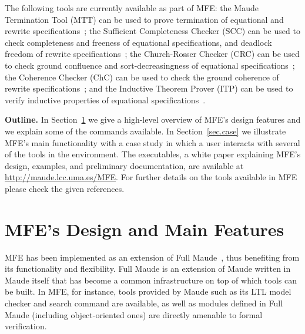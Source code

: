 \documentclass{llncs}
\begin{document}
The following tools are currently available as part of MFE: the Maude Termination
Tool (MTT) can be used to prove termination of equational and rewrite specifications~\cite{Duran-Lucas-Meseguer:2008-ijcar}; %
the Sufficient Completeness Checker (SCC)
can be used to check completeness and freeness of equational specifications, and deadlock freedom of rewrite specifications~\cite{Hendrix:2008,Rocha-Meseguer:2010}; %
the Church-Rosser Checker (CRC) can be used to check
ground confluence and sort-decreasingness of equational
specifications~\cite{Duran-Meseguer:2010-wrla-crc}; %
the Coherence Checker (ChC) can be used to check
the ground coherence of rewrite specifications~\cite{Duran-Meseguer:2010-wrla-chc}; %
and the Inductive Theorem Prover (ITP) can be used to verify inductive properties
of equational specifications~\cite{Clavel-Palomino-Riesco:2006,Hendrix:2008}. %

{\bf Outline.} In Section~\ref{sec.des} we give a high-level overview
of MFE's design features
and we explain some of the
commands available. %
In Section~\ref{sec.case} we
illustrate MFE's main functionality
with a case study in which a user interacts with several of the tools in the environment.  
The executables, a white paper explaining MFE's design,
examples, and preliminary documentation, are available
at \url{http://maude.lcc.uma.es/MFE}. For further details on the tools
available in MFE please check the given references.

\section{MFE's Design and Main Features}
\label{sec.des}

MFE has been implemented as an extension of Full Maude~\cite{Duran-Meseguer:2007-scp}, %
thus benefiting from its functionality and flexibility.  
Full Maude is an extension of Maude written in Maude itself that has become a common 
infrastructure on top of which tools can be built.
In MFE, for instance, tools provided by Maude such as
its LTL model checker and search command are available, as well as
modules defined in Full Maude (including object-oriented ones)
are directly amenable to formal verification.
\end{document}
